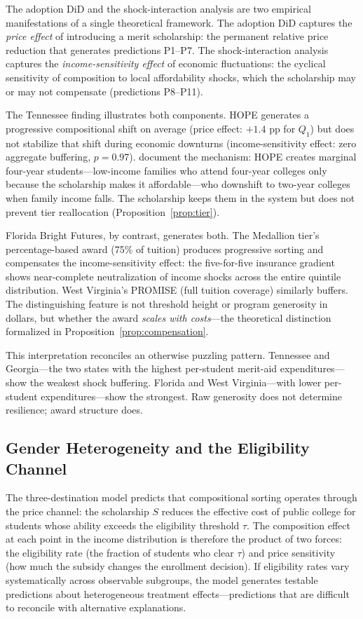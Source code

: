 The adoption DiD and the shock-interaction analysis are two empirical
manifestations of a single theoretical framework. The adoption DiD
captures the \emph{price effect} of introducing a merit
scholarship: the permanent relative price reduction that generates
predictions P1--P7. The shock-interaction analysis captures the
\emph{income-sensitivity effect} of economic fluctuations: the
cyclical sensitivity of composition to local affordability shocks,
which the scholarship may or may not compensate (predictions
P8--P11).

The Tennessee finding illustrates both components. HOPE generates a
progressive compositional shift on average (price effect:
$+1.4$ pp for $Q_1$) but does not stabilize that shift during economic
downturns (income-sensitivity effect: zero aggregate buffering,
$p = 0.97$).
\textcite{bruce2014jackpot} document the mechanism: HOPE creates
marginal four-year students---low-income families who attend four-year
colleges only because the scholarship makes it affordable---who
downshift to two-year colleges when family income falls. The
scholarship keeps them in the system but does not prevent tier
reallocation (Proposition~\ref{prop:tier}).

Florida Bright Futures, by contrast, generates both. The Medallion
tier's percentage-based award (75\% of tuition) produces progressive
sorting and compensates the income-sensitivity effect: the
five-for-five insurance
gradient shows near-complete neutralization of income shocks across
the entire quintile distribution. West Virginia's PROMISE (full tuition
coverage) similarly buffers. The distinguishing feature is not
threshold height or program generosity in dollars, but whether the
award \emph{scales with costs}---the theoretical distinction formalized
in Proposition~\ref{prop:compensation}.

This interpretation reconciles an otherwise puzzling pattern. Tennessee
and Georgia---the two states with the highest per-student merit-aid
expenditures---show the weakest shock buffering. Florida and West
Virginia---with lower per-student expenditures---show the strongest.
Raw generosity does not determine resilience; award structure does.

\subsection{Gender Heterogeneity and the Eligibility Channel}
\label{sec:gender_mechanism}

The three-destination model predicts that compositional sorting
operates through the price channel: the scholarship $S$ reduces the
effective cost of public college for students whose ability exceeds
the eligibility threshold $\tau$. The composition effect at each
point in the income distribution is therefore the product of two
forces: the eligibility rate (the fraction of students who clear
$\tau$) and price sensitivity (how much the subsidy changes the
enrollment decision). If eligibility rates vary systematically across
observable subgroups, the model generates testable predictions about
heterogeneous treatment effects---predictions that are difficult to
reconcile with alternative explanations.

